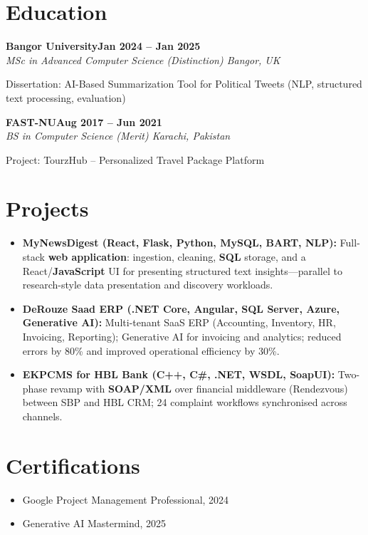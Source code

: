 \documentclass[letterpaper,10pt]{article}
\newcommand{\headingBf}[2]{
  \hspace{10pt}\textbf{#1}\hfill\textbf{#2}\\
}
\newcommand{\headingIt}[2]{
  \hspace{10pt}\textit{#1}\hfill\textit{#2}\\
}
\newenvironment{resume_list}{
  \vspace{-7pt}
  \begin{itemize}[itemsep=-2px, parsep=1pt, leftmargin=30pt]
}{
  \end{itemize}
}
\begin{document}
\section{Education}

\headingBf{Bangor University}{Jan 2024 -- Jan 2025}
\headingIt{MSc in Advanced Computer Science (Distinction) \hfill Bangor, UK}{}
\begin{resume_list}
    \item Dissertation: AI-Based Summarization Tool for Political Tweets (NLP, structured text processing, evaluation)
\end{resume_list}

\headingBf{FAST-NU}{Aug 2017 -- Jun 2021}
\headingIt{BS in Computer Science (Merit) \hfill Karachi, Pakistan}{}
\begin{resume_list}
    \item Project: TourzHub -- Personalized Travel Package Platform
\end{resume_list}

\section{Projects}
\begin{itemize}
    \setlength\itemsep{3pt}
    \item \textbf{MyNewsDigest (React, Flask, Python, MySQL, BART, NLP):} Full-stack \textbf{web application}: ingestion, cleaning, \textbf{SQL} storage, and a React/\textbf{JavaScript} UI for presenting structured text insights---parallel to research-style data presentation and discovery workloads.
    \item \textbf{DeRouze Saad ERP (.NET Core, Angular, SQL Server, Azure, Generative AI):} Multi-tenant SaaS ERP (Accounting, Inventory, HR, Invoicing, Reporting); Generative AI for invoicing and analytics; reduced errors by 80\% and improved operational efficiency by 30\%.
    \item \textbf{EKPCMS for HBL Bank (C++, C\#, .NET, WSDL, SoapUI):} Two-phase revamp with \textbf{SOAP/XML} over financial middleware (Rendezvous) between SBP and HBL CRM; 24 complaint workflows synchronised across channels.
\end{itemize}

\section{Certifications}
\begin{itemize}
    \item Google Project Management Professional, 2024
    \item Generative AI Mastermind, 2025
\end{itemize}

\vspace*{\fill}
\end{document}
